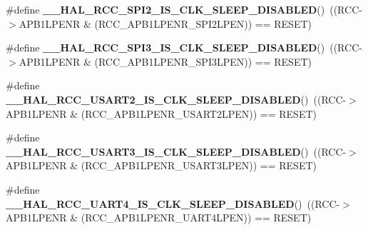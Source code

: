 \begin{DoxyCompactItemize}
\item 
\mbox{\label{group___r_c_c___clock___sleep___enable___disable___status_ga38ba0cbb661739ca615881f2ecfcd1c4}} 
\#define {\bfseries \+\_\+\+\_\+\+H\+A\+L\+\_\+\+R\+C\+C\+\_\+\+S\+P\+I2\+\_\+\+I\+S\+\_\+\+C\+L\+K\+\_\+\+S\+L\+E\+E\+P\+\_\+\+D\+I\+S\+A\+B\+L\+ED}()~((R\+CC-\/$>$A\+P\+B1\+L\+P\+E\+NR \& (R\+C\+C\+\_\+\+A\+P\+B1\+L\+P\+E\+N\+R\+\_\+\+S\+P\+I2\+L\+P\+EN)) == R\+E\+S\+ET)
\item 
\mbox{\label{group___r_c_c___clock___sleep___enable___disable___status_ga1cb97681bfd048c5adda494d33b18392}} 
\#define {\bfseries \+\_\+\+\_\+\+H\+A\+L\+\_\+\+R\+C\+C\+\_\+\+S\+P\+I3\+\_\+\+I\+S\+\_\+\+C\+L\+K\+\_\+\+S\+L\+E\+E\+P\+\_\+\+D\+I\+S\+A\+B\+L\+ED}()~((R\+CC-\/$>$A\+P\+B1\+L\+P\+E\+NR \& (R\+C\+C\+\_\+\+A\+P\+B1\+L\+P\+E\+N\+R\+\_\+\+S\+P\+I3\+L\+P\+EN)) == R\+E\+S\+ET)
\item 
\mbox{\label{group___r_c_c___clock___sleep___enable___disable___status_gad83f4e02928278fc0d9373020a82f4e0}} 
\#define {\bfseries \+\_\+\+\_\+\+H\+A\+L\+\_\+\+R\+C\+C\+\_\+\+U\+S\+A\+R\+T2\+\_\+\+I\+S\+\_\+\+C\+L\+K\+\_\+\+S\+L\+E\+E\+P\+\_\+\+D\+I\+S\+A\+B\+L\+ED}()~((R\+CC-\/$>$A\+P\+B1\+L\+P\+E\+NR \& (R\+C\+C\+\_\+\+A\+P\+B1\+L\+P\+E\+N\+R\+\_\+\+U\+S\+A\+R\+T2\+L\+P\+EN)) == R\+E\+S\+ET)
\item 
\mbox{\label{group___r_c_c___clock___sleep___enable___disable___status_gad5c5c2cf7612ea68ae679de26f0bc26e}} 
\#define {\bfseries \+\_\+\+\_\+\+H\+A\+L\+\_\+\+R\+C\+C\+\_\+\+U\+S\+A\+R\+T3\+\_\+\+I\+S\+\_\+\+C\+L\+K\+\_\+\+S\+L\+E\+E\+P\+\_\+\+D\+I\+S\+A\+B\+L\+ED}()~((R\+CC-\/$>$A\+P\+B1\+L\+P\+E\+NR \& (R\+C\+C\+\_\+\+A\+P\+B1\+L\+P\+E\+N\+R\+\_\+\+U\+S\+A\+R\+T3\+L\+P\+EN)) == R\+E\+S\+ET)
\item 
\mbox{\label{group___r_c_c___clock___sleep___enable___disable___status_gaf8226e0579e9204a426d86d21e6c1ee0}} 
\#define {\bfseries \+\_\+\+\_\+\+H\+A\+L\+\_\+\+R\+C\+C\+\_\+\+U\+A\+R\+T4\+\_\+\+I\+S\+\_\+\+C\+L\+K\+\_\+\+S\+L\+E\+E\+P\+\_\+\+D\+I\+S\+A\+B\+L\+ED}()~((R\+CC-\/$>$A\+P\+B1\+L\+P\+E\+NR \& (R\+C\+C\+\_\+\+A\+P\+B1\+L\+P\+E\+N\+R\+\_\+\+U\+A\+R\+T4\+L\+P\+EN)) == R\+E\+S\+ET)

\end{DoxyCompactItemize}
